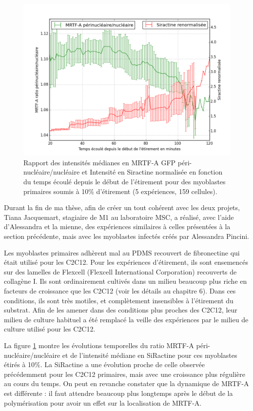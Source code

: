 \begin{figure}
\includegraphics[scale=0.4]{Figures/Siractine_MRTFA_vs_temps.png} 
\caption{Rapport des intensités médianes en MRTF-A GFP  péri-nucléaire/nucléaire et Intensité en Siractine normalisée en fonction du temps écoulé depuis le début de l'étirement pour des myoblastes primaires soumis à 10\% d'étirement (5 expériences, 159 cellules). \label{myoblastes_Sir}}
\end{figure}
Durant la fin de ma thèse, afin de créer un tout cohérent avec les deux projets, Tiana Jacquemart, stagiaire de M1 au laboratoire MSC, a réalisé, avec l'aide d'Alessandra et la mienne, des expériences similaires à celles présentées à la section précédente, mais avec les myoblastes infectés créés par Alessandra Pincini. 

Les myoblastes primaires adhèrent mal au PDMS recouvert de fibronectine qui était utilisé pour les C2C12. Pour les expériences d'étirement, ils sont ensemencés sur des lamelles de Flexcell (Flexcell International Corporation) recouverts de collagène I. 
Ils sont ordinairement cultivés dans un milieu beaucoup plus riche en facteurs de croissance que les C2C12 (voir les détails au chapitre 6). 
Dans ces conditions, ils sont très motiles, et complètement insensibles à l'étirement du substrat. 
Afin de les amener dans des conditions plus proches des C2C12, leur milieu de culture habituel a été remplacé la veille des expériences par le milieu de culture utilisé pour les C2C12. 



La figure \ref{myoblastes_Sir} montre les évolutions temporelles du ratio MRTF-A péri-nucléaire/nucléaire et de l'intensité médiane en SiRactine pour ces myoblastes étirés à 10\%. 
La SiRactine a une évolution proche de celle observée précédemment pour les C2C12 primaires, mais avec une croissance plus régulière au cours du temps. On peut en revanche constater que la dynamique de MRTF-A est différente : il faut attendre beaucoup plus longtemps après le début de la polymérisation pour avoir un effet sur la localisation de MRTF-A. 

